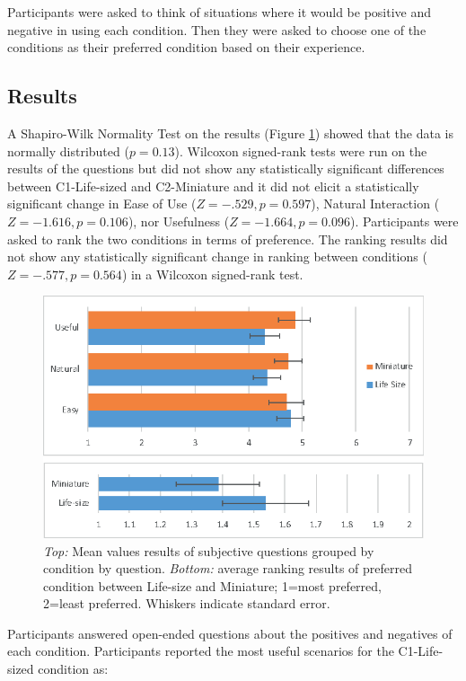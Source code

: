 Participants were asked to think of situations where it would be positive and negative in using each condition. Then they were asked to choose one of the conditions as their preferred condition based on their experience.

\subsection{Results}

A Shapiro-Wilk Normality Test on the results (Figure \ref{fig:continuum:results}) showed that the data is normally distributed ($p=0.13$). Wilcoxon signed-rank tests were run on the results of the questions but did not show any statistically significant differences between C1-Life-sized and C2-Miniature and it did not elicit a statistically significant change in Ease of Use ($Z=-.529, p=0.597$), Natural Interaction ($Z=-1.616, p=0.106$), nor Usefulness ($Z=-1.664, p=0.096$). Participants were asked to rank the two conditions in terms of preference. The ranking results did not show any statistically significant change in ranking between conditions ($Z=-.577, p=0.564$) in a Wilcoxon signed-rank test.

\begin{figure}[ht]
    \centering
    \includegraphics[width=0.8\linewidth]{images/42-placement-ismar17/images-09.eps}
    \caption{\textit{Top:} Mean values results of subjective questions grouped by condition by question. \textit{Bottom:} average ranking results of preferred condition between Life-size and Miniature; 1=most preferred, 2=least preferred. Whiskers indicate standard error.}
    \label{fig:continuum:results}
\end{figure}

Participants answered open-ended questions about the positives and negatives of each condition. Participants reported the most useful scenarios for the C1-Life-sized condition as:

